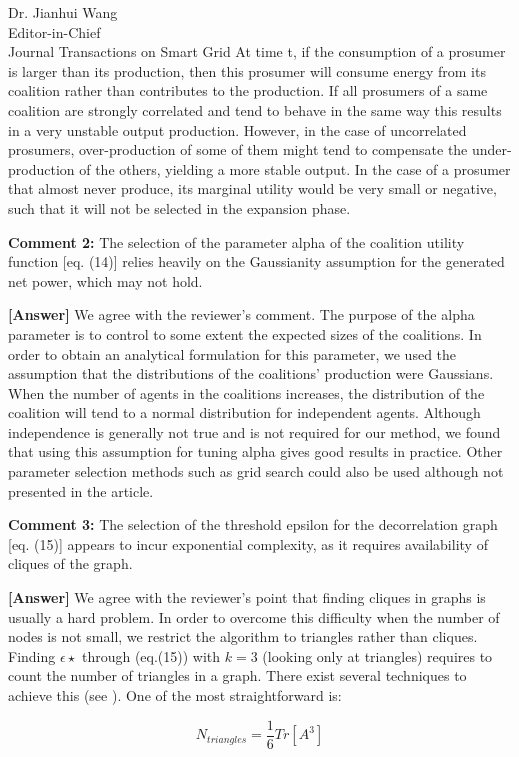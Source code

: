 \documentclass{letter}
\begin{document}
\begin{letter}{Dr. Jianhui Wang \\ Editor-in-Chief \\ Journal Transactions on Smart Grid }
At time t, if the consumption of a prosumer is larger than its production, then this prosumer will consume energy from its coalition rather than contributes to the production. If all prosumers of a same coalition are strongly correlated and tend to behave in the same way this results in a very unstable output production. However, in the case of uncorrelated prosumers, over-production of some of them might tend to compensate the under-production of the others, yielding a more stable output. In the case of a prosumer that almost never produce, its marginal utility would be very small or negative, such that it will not be selected in the expansion phase.


\textbf{Comment 2:} The selection of the parameter alpha of the coalition utility function [eq. (14)] relies heavily on the Gaussianity assumption for the generated net power, which may not hold.


\textbf{[Answer]} We agree with the reviewer’s comment. The purpose of the alpha parameter is to control to some extent the expected sizes of the coalitions. In order to obtain an analytical formulation for this parameter, we used the assumption that the distributions of the coalitions’ production were Gaussians. When the number of agents in the coalitions increases, the distribution of the coalition will tend to a normal distribution for independent agents. Although independence is generally not true and is not required for our method, we found that using this assumption for tuning alpha gives good results in practice. Other parameter selection methods such as grid search could also be used although not presented in the article.


\textbf{Comment 3:} The selection of the threshold epsilon for the decorrelation graph [eq. (15)] appears to incur exponential complexity, as it requires availability of cliques of the graph.


\textbf{[Answer]} We agree with the reviewer’s point that finding cliques in graphs is usually a hard problem. In order to overcome this difficulty when the number of nodes is not small, we restrict the algorithm to triangles rather than cliques. Finding $ \epsilon{\star} $ through (eq.(15)) with $ k = 3 $ (looking only at triangles) requires to count the number of triangles in a graph. There exist several techniques to achieve this (see \cite{Schank2001}). One of the most straightforward is:

\begin{equation}
 N_{triangles} = \frac{1}{6} Tr \left[ A^3 \right] 
\end{equation}
 

\end{letter}
\end{document}
